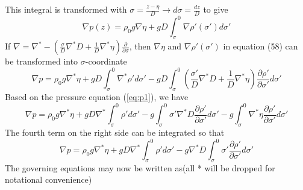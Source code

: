 \documentclass[oribibl]{llncs}
\begin{document}
This integral is transformed with $\sigma=\frac{z-\eta}{D} \rightarrow d\sigma=\frac{dz}{D} $ to give
\begin{equation}
\nabla p(z) = \rho_0 g \nabla\eta +g D\int_\sigma^0 \nabla\rho'(\sigma') d\sigma'
\end{equation}
If $\nabla = \nabla^* -\left( \frac{\sigma}{D}\nabla^*D +\frac{1}{D}\nabla^*\eta \right)\frac{\partial}{\partial \sigma}$, then $\nabla\eta$ and $\nabla\rho'(\sigma')$ in equation (58) can be transformed into $\sigma$-coordinate 
\begin{equation}\label{eq:p1}
\nabla p = \rho_0 g \nabla^*\eta  + g D\int_\sigma^0 \nabla^* \rho' d\sigma' - gD \int_\sigma^0(\frac{\sigma'}{D}\nabla^*D +\frac{1}{D}\nabla^*\eta) \frac{\partial \rho'}{\partial \sigma'} d\sigma'
\end{equation}
Based on the pressure equation (\ref{eq:p1}), we have 
\begin{equation}
\nabla p = \rho_0 g \nabla^* \eta  + gD\nabla^*\int_\sigma^0\rho' d\sigma' -  g\int_\sigma^0\sigma'\nabla^*D\frac{\partial \rho'}{\partial \sigma'} d\sigma'  -g\int_\sigma^0 \nabla^* \eta\frac{\partial \rho'}{\partial \sigma'} d\sigma' 
\end{equation}
The fourth term on the right side can be integrated so that
\begin{equation}
\nabla p = \rho_0 g \nabla^* \eta  +gD\nabla^*\int_\sigma^0\rho'd\sigma'  -g\nabla^*D\int_\sigma^0\sigma'\frac{\partial \rho'}{\partial \sigma'} d\sigma'
\end{equation}
The governing equations may now be written as(all * will be dropped for notational convenience)
\end{document}
